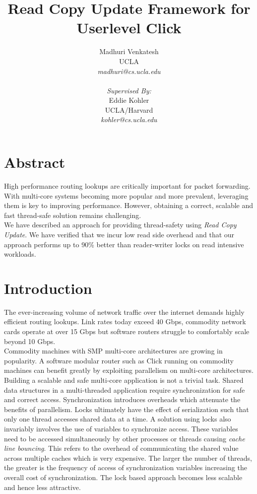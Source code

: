 \documentclass[a4paper,marginparwidth=50pt,marginparsep=10pt]{article}
\begin{document}
\author { 
Madhuri Venkatesh 
\\ UCLA 
\\ \textsl{madhuri@cs.ucla.edu}
\\
\\
\textsl{Supervised By:}
\\Eddie Kohler 
\\ UCLA/Harvard
\\ \textsl{kohler@cs.ucla.edu}
}
\title{Read Copy Update Framework for Userlevel Click}
\maketitle

\pagebreak
\section{Abstract}
High performance routing lookups are critically important for packet forwarding. With multi-core systems becoming more popular and more prevalent, leveraging them is key to improving performance. However, obtaining a correct, scalable and fast thread-safe solution remains challenging.\\

We have described an approach for providing thread-safety using \emph{Read Copy Update}. We have verified that we incur low read side overhead and that our approach performs up to 90\% better than reader-writer locks on read intensive workloads.
\section{Introduction}
The ever-increasing volume of network traffic over the internet demands highly efficient routing lookups. Link rates today exceed 40 Gbps, commodity network cards operate at over 15 Gbps but software routers struggle to comfortably scale beyond 10 Gbps\cite{routebricks}.\\

Commodity machines with SMP multi-core architectures are growing in popularity. A software modular router such as Click\cite{click} running on commodity machines  can benefit greatly by exploiting parallelism on multi-core architectures.\\

Building a scalable and safe multi-core application is not a trivial task. Shared data structures in a multi-threaded application require synchronization for safe and correct access. Synchronization introduces overheads which attenuate the benefits of parallelism. Locks ultimately have the effect of  serialization such that only one thread accesses shared data at a time. A solution using locks also invariably involves the use of variables to synchronize access. These variables need to be accessed simultaneously by other processes or threads causing \emph{cache line bouncing}. This refers to the overhead of communicating the shared value across multiple caches which is very expensive. The larger the number of threads, the greater is the frequency of access of synchronization variables increasing the overall cost of synchronization. The lock based approach becomes less scalable and hence less attractive.\\
\end{document}
